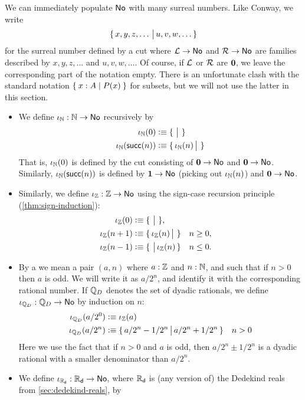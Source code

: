 We can immediately populate $\mathsf{No}$ with many surreal numbers.
Like Conway, we write
\[\{\,x,y,z,\dots\,\big|\,u,v,w,\dots\,\}\]
for the surreal number defined by a cut where $\mathcal{L}\to\mathsf{No}$ and $\mathcal{R}\to\mathsf{No}$ are families described by $x,y,z,\dots$ and $u,v,w,\dots$.
Of course, if $\mathcal{L}$ or $\mathcal{R}$ are $\mathbf{0}$, we leave the corresponding part of the notation empty.
There is an unfortunate clash with the standard notation $\Set{x:A | P(x)}$ for subsets, but we will not use the latter in this section.
\begin{itemize}
\item We define $\iota_{\mathbb{N}}:\mathbb{N}\to\mathsf{No}$ recursively by
  \begin{align*}
    \iota_{\mathbb{N}}(0) &\vcentcolon\equiv \{\,\,\big|\,\,\}\\
    \iota_\mathbb{N}(\mathsf{succ}(n)) &\vcentcolon\equiv \{\,\iota_\mathbb{N}(n)\,\big|\,\,\}
  \end{align*}
  That is, $\iota_\mathbb{N}(0)$ is defined by the cut consisting of $\mathbf{0}\to\mathsf{No}$ and $\mathbf{0}\to\mathsf{No}$.
  Similarly, $\iota_\mathbb{N}(\mathsf{succ}(n))$ is defined by $\mathbf{1}\to\mathsf{No}$ (picking out $\iota_\mathbb{N}(n)$) and $\mathbf{0}\to\mathsf{No}$.
\item Similarly, we define $\iota_{\mathbb{Z}}:\mathbb{Z}\to\mathsf{No}$ using the sign-case recursion principle (\autoref{thm:sign-induction}):
  \begin{align*}
    \iota_{\mathbb{Z}}(0) &\vcentcolon\equiv \{\,\,\big|\,\,\},\\
    \iota_\mathbb{Z}(n+1) &\vcentcolon\equiv \{\,\iota_\mathbb{Z}(n)\,\big|\,\,\} & &\text{$n\ge 0$,}\\
    \iota_\mathbb{Z}(n-1) &\vcentcolon\equiv \{\,\,\big|\,\iota_\mathbb{Z}(n)\,\} & &\text{$n\le 0$.}
  \end{align*}
\item By a 
  we mean a pair $(a,n)$ where $a:\mathbb{Z}$ and $n:\mathbb{N}$, and such that if $n>0$ then $a$ is odd.
  We will write it as $a/2^n$, and identify it with the corresponding rational number.
  If $\mathbb{Q}_D$ denotes the set of dyadic rationals, we define $\iota_{\mathbb{Q}_D}:\mathbb{Q}_D\to\mathsf{No}$ by induction on $n$:
  \begin{align*}
    \iota_{\mathbb{Q}_D}(a/2^0) &\vcentcolon\equiv \iota_\mathbb{Z}(a)\\
    \iota_{\mathbb{Q}_D}(a/2^n) &\vcentcolon\equiv \{\,a/2^n - 1/2^n\,\big|\,a/2^n + 1/2^n\,\} \quad n>0
  \end{align*}
  Here we use the fact that if $n>0$ and $a$ is odd, then $a/2^n \pm 1/2^n$ is a dyadic rational with a smaller denominator than $a/2^n$.
\item We define $\iota_{\mathbb{R}_\mathsf{d}}:\mathbb{R}_\mathsf{d}\to\mathsf{No}$, where $\mathbb{R}_\mathsf{d}$ is (any version of) the Dedekind reals from \autoref{sec:dedekind-reals}, by

\end{itemize}
